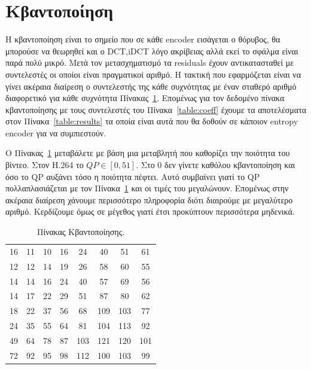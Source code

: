 \newpage
\section{Κβαντοποίηση}
\label{section:sect25}

\indent Η κβαντοποίηση είναι το σημείο που σε κάθε encoder εισάγεται ο θόρυβος, θα μπορούσε να θεωρηθεί και ο DCT,iDCT λόγο ακρίβειας αλλά εκεί το σφάλμα είναι παρά πολύ μικρό. Μετά τον μετασχηματισμό τα residuals έχουν αντικατασταθεί με συντελεστές οι οποίοι είναι πραγματικοί αριθμό. Η τακτική που εφαρμόζεται είναι να γίνει ακέραια διαίρεση ο συντελεστής της κάθε συχνότητας με έναν σταθερό αριθμό διαφορετικό για κάθε συχνότητα Πίνακας~\ref{table:quanttable}. Επομένως για τον δεδομένο πίνακα κβαντοποίησης με τους συντελεστές του Πίνακα~\ref{table:coeff} έχουμε τα αποτελέσματα στον Πίνακα~\ref{table:results} τα οποία είναι αυτά που θα δοθούν σε κάποιον entropy encoder για να συμπιεστούν.

\indent Ο Πίνακας~\ref{table:quanttable} μεταβάλετε με βάση μια μεταβλητή που καθορίζει την ποιότητα του βίντεο. Στον H.264 το $QP \in [0,51] $. Στο 0 δεν γίνετε καθόλου κβαντοποίηση και όσο το QP αυξάνει τόσο η ποιότητα πέφτει. Αυτό συμβαίνει γιατί το QP πολλαπλασιάζεται με τον Πίνακα~\ref{table:quanttable} και οι τιμές του μεγαλώνουν. Επομένως στην ακέραια διαίρεση χάνουμε περισσότερο πληροφορία διότι διαιρούμε με μεγαλύτερο αριθμό. Κερδίζουμε όμως σε μέγεθος γιατί έτσι προκύπτουν περισσότερα μηδενικά.

\begin{table}[H]
    \begin{center}
        \begin{tabular}{| c  c  c  c  c  c  c  c |}
        \hline
        16 & 11 & 10 & 16 & 24 & 40 & 51 & 61 \\
        12 & 12 & 14 & 19 & 26 & 58 & 60 & 55 \\
        14 & 14 & 16 & 24 & 40 & 57 & 69 & 56 \\
        14 & 17 & 22 & 29 & 51 & 87 & 80 & 62 \\
        18 & 22 & 37 & 56 & 68 & 109 & 103 & 77 \\
        24 & 35 & 55 & 64 & 81 & 104 & 113 & 92 \\
        49 & 64 & 78 & 87 & 103 & 121 & 120 & 101 \\
        72 & 92 & 95 & 98 & 112 & 100 & 103 & 99 \\
        \hline
        \end{tabular}
    \end{center}
    \caption{Πίνακας Κβαντοποίησης. \cite{wiki:jpeg}}
    \label{table:quanttable}
\end{table}

